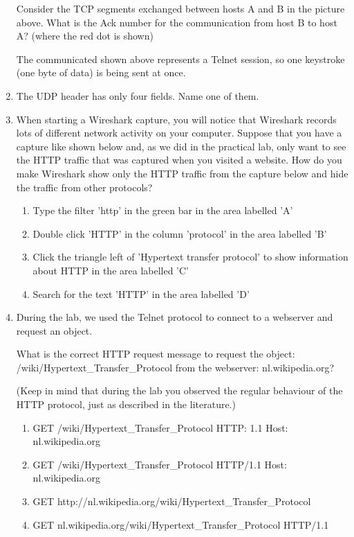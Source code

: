 \begin{enumerate}
    Consider the TCP segments exchanged between hosts A and B in the picture above. What is the Ack number for the communication from host B to host A? (where the red dot is shown)

    The communicated shown above represents a Telnet session, so one keystroke (one byte of data) is being sent at once.
    \item The UDP header has only four fields. Name one of them.
    \item When starting a Wireshark capture, you will notice that Wireshark records lots of different network activity on your computer. Suppose that you have a capture like shown below and, as we did in the practical lab, only want to see the HTTP traffic that was captured when you visited a website. How do you make Wireshark show only the HTTP traffic from the capture below and hide the traffic from other protocols?
    \begin{enumerate}
        \item Type the filter 'http' in the green bar in the area labelled 'A'
        \item Double click 'HTTP' in the column 'protocol' in the area labelled 'B'
        \item Click the triangle left of 'Hypertext transfer protocol' to show information about HTTP in the area labelled 'C'
        \item Search for the text 'HTTP' in the area labelled 'D'
    \end{enumerate}
    \item During the lab, we used the Telnet protocol to connect to a webserver and request an object.

    What is the correct HTTP request message to request the object: /wiki/Hypertext\_Transfer\_Protocol from the webserver: nl.wikipedia.org?

    (Keep in mind that during the lab you observed the regular behaviour of the HTTP protocol, just as described in the literature.)
    \begin{enumerate}
        \item
        GET /wiki/Hypertext\_Transfer\_Protocol \newline
        HTTP: 1.1 \newline
        Host: nl.wikipedia.org
        \item
        GET /wiki/Hypertext\_Transfer\_Protocol HTTP/1.1 \newline
        Host: nl.wikipedia.org

        \item
        GET http://nl.wikipedia.org/wiki/Hypertext\_Transfer\_Protocol

        \item
        GET nl.wikipedia.org/wiki/Hypertext\_Transfer\_Protocol HTTP/1.1
    \end{enumerate}
\end{enumerate}
